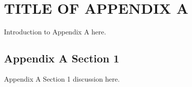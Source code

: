 \noappendicestocpagenum
\addappheadtotoc
\chapter{TITLE OF APPENDIX A} %
Introduction to Appendix A here.

\section{Appendix A Section 1}

Appendix A Section 1 discussion here.